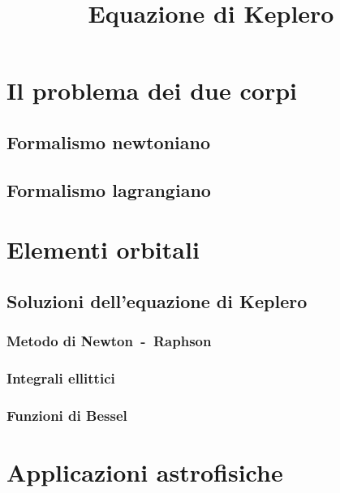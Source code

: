 \documentclass[a4paper,oneside,fleqn]{book}
\title{Equazione di Keplero}
\begin{document}
\maketitle{} %

\chapter{Il problema dei due corpi}
\label{chap:due-corpi}

\section{Formalismo newtoniano}
\label{sec:formalismo-newton}

\section{Formalismo lagrangiano}
\label{sec:formalismo-lagrange}

\chapter{Elementi orbitali}
\label{chap:elementi-orbitali}

\section{Soluzioni dell'equazione di Keplero}
\label{sec:soluzioni}

\subsection{Metodo di Newton~-~Raphson}
\label{sec:newton}

\subsection{Integrali ellittici}
\label{sec:integrali-ellittici}

\subsection{Funzioni di Bessel}
\label{sec:bessel}

\chapter{Applicazioni astrofisiche}
\label{chap:applicazioni}
\end{document}
